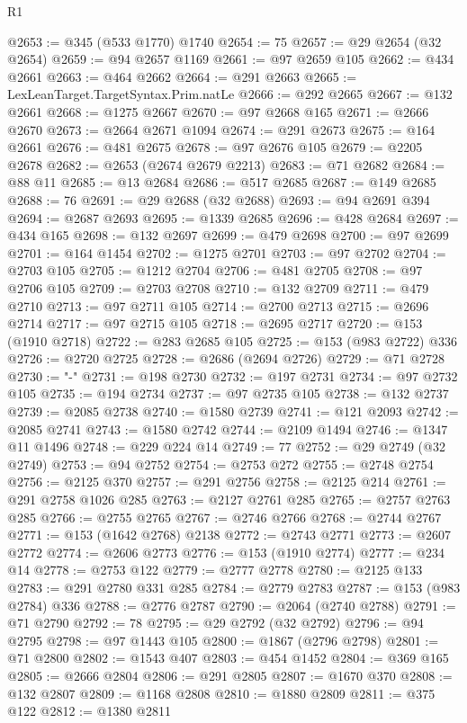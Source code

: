 \begin{lexlean}{R1}
\begin{coremodule}
@2653 := @345 (@533 @1770) @1740
@2654 := 75
@2657 := @29 @2654 (@32 @2654)
@2659 := @94 @2657 @1169
@2661 := @97 @2659 @105
@2662 := @434 @2661
@2663 := @464 @2662
@2664 := @291 @2663
@2665 := LexLeanTarget.TargetSyntax.Prim.natLe
@2666 := @292 @2665
@2667 := @132 @2661
@2668 := @1275 @2667
@2670 := @97 @2668 @165
@2671 := @2666 @2670
@2673 := @2664 @2671 @1094
@2674 := @291 @2673
@2675 := @164 @2661
@2676 := @481 @2675
@2678 := @97 @2676 @105
@2679 := @2205 @2678
@2682 := @2653 (@2674 @2679 @2213)
@2683 := @71 @2682
@2684 := @88 @11
@2685 := @13 @2684
@2686 := @517 @2685
@2687 := @149 @2685
@2688 := 76
@2691 := @29 @2688 (@32 @2688)
@2693 := @94 @2691 @394
@2694 := @2687 @2693
@2695 := @1339 @2685
@2696 := @428 @2684
@2697 := @434 @165
@2698 := @132 @2697
@2699 := @479 @2698
@2700 := @97 @2699
@2701 := @164 @1454
@2702 := @1275 @2701
@2703 := @97 @2702
@2704 := @2703 @105
@2705 := @1212 @2704
@2706 := @481 @2705
@2708 := @97 @2706 @105
@2709 := @2703 @2708
@2710 := @132 @2709
@2711 := @479 @2710
@2713 := @97 @2711 @105
@2714 := @2700 @2713
@2715 := @2696 @2714
@2717 := @97 @2715 @105
@2718 := @2695 @2717
@2720 := @153 (@1910 @2718)
@2722 := @283 @2685 @105
@2725 := @153 (@983 @2722) @336
@2726 := @2720 @2725
@2728 := @2686 (@2694 @2726)
@2729 := @71 @2728
@2730 := "-"
@2731 := @198 @2730
@2732 := @197 @2731
@2734 := @97 @2732 @105
@2735 := @194 @2734
@2737 := @97 @2735 @105
@2738 := @132 @2737
@2739 := @2085 @2738
@2740 := @1580 @2739
@2741 := @121 @2093
@2742 := @2085 @2741
@2743 := @1580 @2742
@2744 := @2109 @1494
@2746 := @1347 @11 @1496
@2748 := @229 @224 @14
@2749 := 77
@2752 := @29 @2749 (@32 @2749)
@2753 := @94 @2752
@2754 := @2753 @272
@2755 := @2748 @2754
@2756 := @2125 @370
@2757 := @291 @2756
@2758 := @2125 @214
@2761 := @291 @2758 @1026 @285
@2763 := @2127 @2761 @285
@2765 := @2757 @2763 @285
@2766 := @2755 @2765
@2767 := @2746 @2766
@2768 := @2744 @2767
@2771 := @153 (@1642 @2768) @2138
@2772 := @2743 @2771
@2773 := @2607 @2772
@2774 := @2606 @2773
@2776 := @153 (@1910 @2774)
@2777 := @234 @14
@2778 := @2753 @122
@2779 := @2777 @2778
@2780 := @2125 @133
@2783 := @291 @2780 @331 @285
@2784 := @2779 @2783
@2787 := @153 (@983 @2784) @336
@2788 := @2776 @2787
@2790 := @2064 (@2740 @2788)
@2791 := @71 @2790
@2792 := 78
@2795 := @29 @2792 (@32 @2792)
@2796 := @94 @2795
@2798 := @97 @1443 @105
@2800 := @1867 (@2796 @2798)
@2801 := @71 @2800
@2802 := @1543 @407
@2803 := @454 @1452
@2804 := @369 @165
@2805 := @2666 @2804
@2806 := @291 @2805
@2807 := @1670 @370
@2808 := @132 @2807
@2809 := @1168 @2808
@2810 := @1880 @2809
@2811 := @375 @122
@2812 := @1380 @2811

\end{coremodule}
\end{lexlean}
